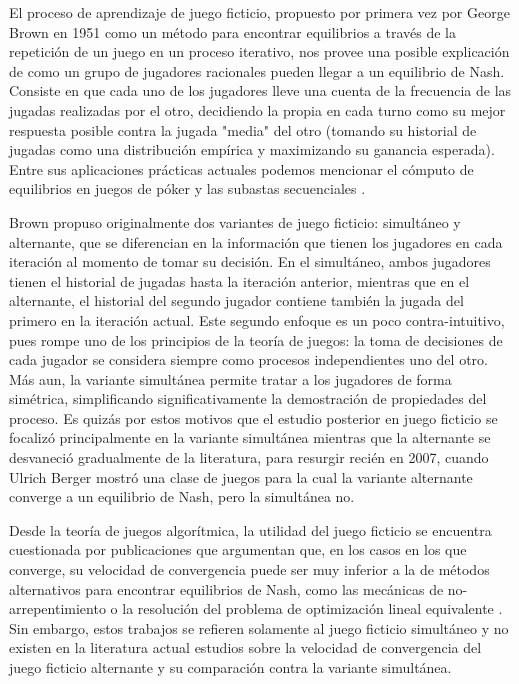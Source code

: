 El proceso de aprendizaje de juego ficticio, propuesto por primera vez por George Brown en 1951 \cite{brown:1951} como un método para encontrar equilibrios a través de la repetición de un juego en un proceso iterativo, nos provee una posible explicación de como un grupo de jugadores racionales pueden llegar a un equilibrio de Nash. Consiste en que cada uno de los jugadores lleve una cuenta de la frecuencia de las jugadas realizadas por el otro, decidiendo la propia en cada turno como su mejor respuesta posible contra la jugada "media" del otro (tomando su historial de jugadas como una distribución empírica y maximizando su ganancia esperada). Entre sus aplicaciones prácticas actuales podemos mencionar el cómputo de equilibrios en juegos de póker \cite{casos:uso:poker} y las subastas secuenciales \cite{casos:uso:subastas:secuenciales}.

Brown propuso originalmente dos variantes de juego ficticio: simultáneo y alternante, que se diferencian en la información que tienen los jugadores en cada iteración al momento de tomar su decisión. En el simultáneo, ambos jugadores tienen el historial de jugadas hasta la iteración anterior, mientras que en el alternante, el historial del segundo jugador contiene también la jugada del primero en la iteración actual. Este segundo enfoque es un poco contra-intuitivo, pues rompe uno de los principios de la teoría de juegos: la toma de decisiones de cada jugador se considera siempre como procesos independientes uno del otro. Más aun, la variante simultánea permite tratar a los jugadores de forma simétrica, simplificando significativamente la demostración de propiedades del proceso. Es quizás por estos motivos que el estudio posterior en juego ficticio se focalizó principalmente en la variante simultánea mientras que la alternante se desvaneció gradualmente de la literatura, para resurgir recién en 2007, cuando Ulrich Berger \cite{browns:original} mostró una clase de juegos para la cual la variante alternante converge a un equilibrio de Nash, pero la simultánea no.

Desde la teoría de juegos algorítmica, la utilidad del juego ficticio se encuentra cuestionada por publicaciones que argumentan que, en los casos en los que converge, su velocidad de convergencia puede ser muy inferior a la de métodos alternativos para encontrar equilibrios de Nash, como las mecánicas de no-arrepentimiento o la resolución del problema de optimización lineal equivalente \cite{modified:fp:linear}. Sin embargo, estos trabajos se refieren solamente al juego ficticio simultáneo y no existen en la literatura actual estudios sobre la velocidad de convergencia del juego ficticio alternante y su comparación contra la variante simultánea.

